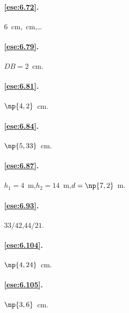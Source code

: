 \paragraph{\ref{ese:6.72}.}
6~cm,~cm,\quad \ldots{}

\paragraph{\ref{ese:6.79}.}
\(DB=2\)~cm.

\paragraph{\ref{ese:6.81}.}
\(\np{4,2}\)~cm.

\paragraph{\ref{ese:6.84}.}
\(\np{5,33}\)~cm.

\paragraph{\ref{ese:6.87}.}
\(h_1=4\)~m,\quad \(h_2=14\)~m,\quad \(d=\np{7,2}\)~m.

\paragraph{\ref{ese:6.93}.}
\(33/42\),\quad \(44/21\).

\paragraph{\ref{ese:6.104}.}
\(\np{4,24}\)~cm.

\paragraph{\ref{ese:6.105}.}
\(\np{3,6}\)~cm.

\endgroup
